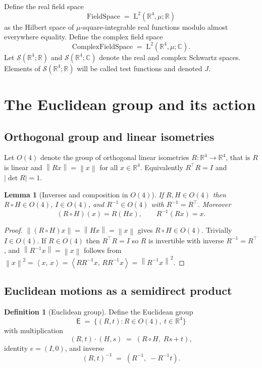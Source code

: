 \documentclass{article}
\newcommand{\R}{\mathbb{R}}
\newcommand{\Rd}{\mathbb{R}^4}
\newcommand{\C}{\mathbb{C}}
\newcommand{\ip}[2]{\left\langle #1,\, #2 \right\rangle}
\newcommand{\norm}[1]{\left\lVert #1 \right\rVert}
\newcommand{\1}{\mathbbm{1}}
\newcommand{\Sch}{\mathscr{S}}
\newcommand{\LP}{\mathrm{L}}
\theoremstyle{plain}
\newtheorem{lemma}[theorem]{Lemma}
\theoremstyle{definition}
\newtheorem{definition}[theorem]{Definition}
\numberwithin{equation}{section}
\begin{document}
Define the real field space
\[
\mathrm{FieldSpace} \;=\; \LP^2(\Rd,\mu;\R)
\]
as the Hilbert space of $\mu$-square-integrable real functions modulo almost everywhere equality. Define the complex field space
\[
\mathrm{ComplexFieldSpace} \;=\; \LP^2(\Rd,\mu;\C).
\]
Let $\Sch(\Rd;\R)$ and $\Sch(\Rd;\C)$ denote the real and complex Schwartz spaces. Elements of $\Sch(\Rd;\R)$ will be called test functions and denoted $J$.

\section{The Euclidean group and its action}

\subsection{Orthogonal group and linear isometries}

Let $O(4)$ denote the group of orthogonal linear isometries $R:\Rd\to\Rd$, that is $R$ is linear and $\norm{Rx}=\norm{x}$ for all $x\in\Rd$. Equivalently $R^\top R=I$ and $|\det R|=1$.

\begin{lemma}[Inverses and composition in $O(4)$]\label{lem:O4group}
If $R,H\in O(4)$ then $R\circ H\in O(4)$, $I\in O(4)$, and $R^{-1}\in O(4)$ with $R^{-1}=R^\top$. Moreover
\[
(R\circ H)(x)=R(Hx), \qquad R^{-1}(Rx)=x.
\]
\end{lemma}

\begin{proof}
$\norm{(R\circ H)x}=\norm{H x}=\norm{x}$ gives $R\circ H\in O(4)$. Trivially $I\in O(4)$. If $R\in O(4)$ then $R^\top R=I$ so $R$ is invertible with inverse $R^{-1}=R^\top$, and $\norm{R^{-1}x}=\norm{x}$ follows from $\norm{x}^2=\ip{x}{x}=\ip{RR^{-1}x}{RR^{-1}x}=\norm{R^{-1}x}^2$.
\end{proof}

\subsection{Euclidean motions as a semidirect product}

\begin{definition}[Euclidean group]\label{def:E}
Define the Euclidean group
\[
\mathsf{E}\;=\;\{(R,t): R\in O(4),\ t\in\Rd\}
\]
with multiplication
\begin{equation}\label{eq:E-mul}
(R,t)\cdot(H,s)\;=\;(R\circ H,\; R s + t),
\end{equation}
identity $e=(I,0)$, and inverse
\begin{equation}\label{eq:E-inv}
(R,t)^{-1}\;=\;(R^{-1},\; - R^{-1} t).
\end{equation}
\end{definition}
\end{document}
